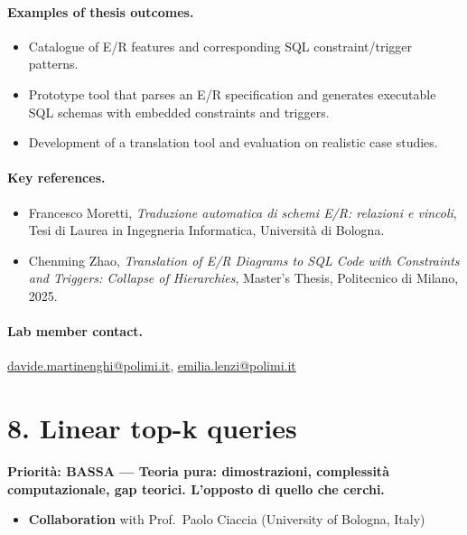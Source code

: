 \documentclass[a4paper,11pt]{article}
\newcommand{\priorita}[1]{%
  \par\smallskip\noindent\textbf{Priorit\`a: #1}\par\smallskip
}
\begin{document}
\paragraph{Examples of thesis outcomes.}
\begin{itemize}[nosep]
  \item Catalogue of E/R features and corresponding SQL constraint/trigger patterns.
  \item Prototype tool that parses an E/R specification and generates executable SQL schemas with embedded constraints and triggers.
  \item Development of a translation tool and evaluation on realistic case studies.
\end{itemize}

\paragraph{Key references.}
\begin{itemize}[nosep]
  \item Francesco Moretti, \emph{Traduzione automatica di schemi E/R: relazioni e vincoli}, Tesi di Laurea in Ingegneria Informatica, Universit\`a di Bologna.
  \item Chenming Zhao, \emph{Translation of E/R Diagrams to SQL Code with Constraints and Triggers: Collapse of Hierarchies}, Master's Thesis, Politecnico di Milano, 2025.
\end{itemize}

\paragraph{Lab member contact.}
\url{davide.martinenghi@polimi.it}, \url{emilia.lenzi@polimi.it}


\section{8. Linear top-k queries}

\priorita{BASSA --- Teoria pura: dimostrazioni, complessit\`a computazionale, gap teorici. L'opposto di quello che cerchi.}

\begin{itemize}[nosep]
  \item \textbf{Collaboration} with Prof.\ Paolo Ciaccia (University of Bologna, Italy)
\end{itemize}
\end{document}
